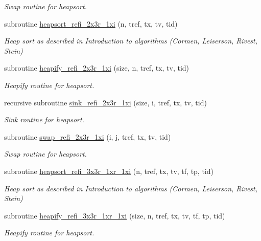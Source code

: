 \begin{DoxyCompactItemize}
\begin{DoxyCompactList}\small\item\em Swap routine for heapsort. \end{DoxyCompactList}\item 
subroutine \hyperlink{classmodsortinterf_ac2dc7168d6a963411656a8c43dfc6cd8}{heapsort\-\_\-refi\-\_\-2x3r\-\_\-1xi} (n, tref, tx, tv, tid)
\begin{DoxyCompactList}\small\item\em Heap sort as described in Introduction to algorithms (Cormen, Leiserson, Rivest, Stein) \end{DoxyCompactList}\item 
subroutine \hyperlink{classmodsortinterf_acb9c4af70266d13a8738766f5b52bab7}{heapify\-\_\-refi\-\_\-2x3r\-\_\-1xi} (size, n, tref, tx, tv, tid)
\begin{DoxyCompactList}\small\item\em Heapify routine for heapsort. \end{DoxyCompactList}\item 
recursive subroutine \hyperlink{classmodsortinterf_a0f21262e3e53f78e25c767296cd12c9d}{sink\-\_\-refi\-\_\-2x3r\-\_\-1xi} (size, i, tref, tx, tv, tid)
\begin{DoxyCompactList}\small\item\em Sink routine for heapsort. \end{DoxyCompactList}\item 
subroutine \hyperlink{classmodsortinterf_a12666fc2e1b7b2fa55a9ef7aad686b6b}{swap\-\_\-refi\-\_\-2x3r\-\_\-1xi} (i, j, tref, tx, tv, tid)
\begin{DoxyCompactList}\small\item\em Swap routine for heapsort. \end{DoxyCompactList}\item 
subroutine \hyperlink{classmodsortinterf_a8cf65af17497fd22fe3d47f5d7d23094}{heapsort\-\_\-refi\-\_\-3x3r\-\_\-1xr\-\_\-1xi} (n, tref, tx, tv, tf, tp, tid)
\begin{DoxyCompactList}\small\item\em Heap sort as described in Introduction to algorithms (Cormen, Leiserson, Rivest, Stein) \end{DoxyCompactList}\item 
subroutine \hyperlink{classmodsortinterf_a02d72af75bb002b065f4298dddebe008}{heapify\-\_\-refi\-\_\-3x3r\-\_\-1xr\-\_\-1xi} (size, n, tref, tx, tv, tf, tp, tid)
\begin{DoxyCompactList}\small\item\em Heapify routine for heapsort. \end{DoxyCompactList}\item 

\end{DoxyCompactItemize}
